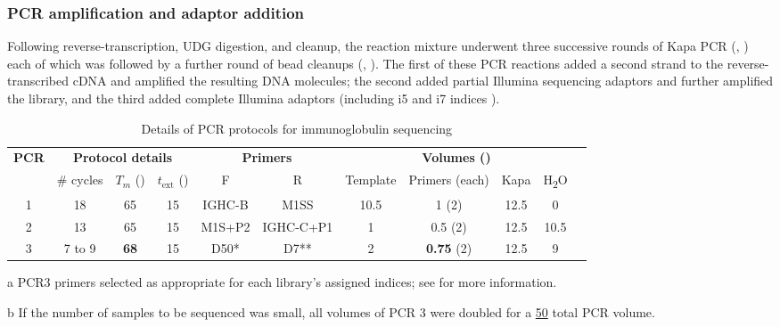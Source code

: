 \subsubsection{PCR amplification and adaptor addition} 
\label{sec:methods_molec_igseq_pcr}


Following reverse-transcription, UDG digestion, and cleanup, the reaction mixture underwent three successive rounds of Kapa PCR (, ) each of which was followed by a further round of bead cleanups (, ). The first of these PCR reactions added a second strand to the reverse-transcribed cDNA and amplified the resulting DNA molecules; the second added partial Illumina sequencing adaptors and further amplified the library, and the third added complete Illumina adaptors (including i5 and i7 indices \parencite{illumina2018adaptors}).

\begin{table}[h]
\def\arraystretch{1.3}
\centering\small
\begin{threeparttable}
\caption{Details of PCR protocols for \Nfu immunoglobulin sequencing}
\begin{tabular}{c|ccc|cc|ccccc}\toprule
\multirow{2}{*}{\textbf{PCR}} & \multicolumn{3}{c|}{\textbf{Protocol details}} & \multicolumn{2}{c|}{\textbf{Primers}} & \multicolumn{4}{c}{\textbf{Volumes (\ul{})\tnote{b}}}\\
 & \# cycles & $T_m$ (\degC{}) & $t_\mathrm{ext}$ (\secs{}) & F & R & Template & Primers (each) & Kapa & H\textsubscript{2}O \\\midrule
1 & 18 & 65 & 15 & IGHC-B & M1SS & 10.5 & 1 (\x{}2) & 12.5 & 0 \\\midrule
2 & 13 & 65 & 15 & M1S+P2 & IGHC-C+P1 & 1 & 0.5 (\x{}2) & 12.5 & 10.5 \\\midrule
3 & 7 to 9 & \textbf{68} & 15 & D50*\tnote{a} & D7**\tnote{a} & 2 & \textbf{0.75} (\x{}2) & 12.5 & 9 \\
\bottomrule %
\end{tabular}
\begin{tablenotes}
\item[a] PCR3 primers selected as appropriate for each library's assigned indices; see  for more information.
\item[b] If the number of samples to be sequenced was small, all volumes of PCR 3 were doubled for a \ul{50} total PCR volume.
\end{tablenotes}
\label{tab:methods_igseq_pcr}
\end{threeparttable}
\end{table}

